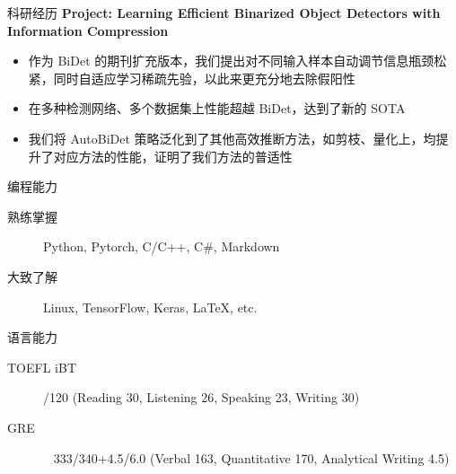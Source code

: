 \documentclass{resume} %
\begin{document}
\begin{rSection}{科研经历}
\textbf{Project: Learning Efficient Binarized Object Detectors with Information Compression}
\begin{itemize}
    \item 作为 BiDet 的期刊扩充版本，我们提出对不同输入样本自动调节信息瓶颈松紧，同时自适应学习稀疏先验，以此来更充分地去除假阳性
    \item 在多种检测网络、多个数据集上性能超越 BiDet，达到了新的 SOTA
    \item 我们将 AutoBiDet 策略泛化到了其他高效推断方法，如剪枝、量化上，均提升了对应方法的性能，证明了我们方法的普适性\newline
\end{itemize}

\end{rSection}

\begin{rSection}{编程能力}

\begin{description}
    \item[熟练掌握] \quad\quad Python, Pytorch, C/C++, C\#, Markdown
    \item[大致了解] \quad\quad Linux, TensorFlow, Keras, LaTeX, etc.
\end{description}

\end{rSection}

\begin{rSection}{语言能力}

\begin{description}
    \item[TOEFL iBT] /120 \quad (Reading 30, Listening 26, Speaking 23, Writing 30)
    \item[GRE] \quad\quad\quad\quad\,\,\, 333/340+4.5/6.0 (Verbal 163, Quantitative 170, Analytical Writing 4.5)%
\end{description}

\end{rSection}
\end{document}
